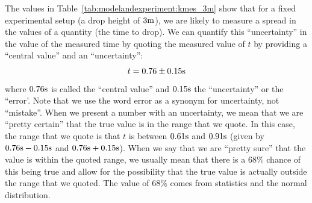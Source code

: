 The values in Table~\ref{tab:modelandexperiment:kmes_3m} show that for a fixed experimental setup (a drop height of $3 {\rm m}$), we are likely to measure a spread in the values of a quantity (the time to drop). We can quantify this ``uncertainty'' in the value of the measured time by quoting the measured value of $t$ by providing a ``central value'' and an ``uncertainty'':
\begin{equation}
t = 0.76 \pm 0.15 {\rm s}
\end{equation}
where $0.76 {\rm s}$ is called the ``central value'' and $0.15 {\rm s}$ the ``uncertainty'' or the ``error'. Note that we use the word error as a synonym for uncertainty, not ``mistake''. When we present a number with an uncertainty, we mean that we are ``pretty certain'' that the true value is in the range that we quote. In this case, the range that we quote is that $t$ is between $0.61 {\rm s}$ and $0.91 {\rm s}$ (given by $0.76 {\rm s} - 0.15 {\rm s}$ and $0.76 {\rm s} + 0.15 {\rm s}$). When we say that we are ``pretty sure'' that the value is within the quoted range, we usually mean that there is a 68\% chance of this being true and allow for the possibility that the true value is actually outside the range that we quoted. The value of 68\% comes from statistics and the normal distribution.

